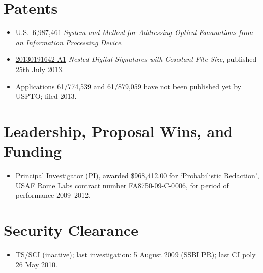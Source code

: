 \documentclass[12pt,twoside,letterpaper]{article}
\begin{document}
\vspace{-8mm}
\section*{Patents}
\vspace{-2mm}
\begin{itemize}
    \item \href{http://www.google.com/patents/US6987461}{U.S.\ 6,987,461} \emph{System and Method
		for Addressing Optical Emanations from an Information Processing Device}.

	\vspace{-2mm}
	\item \href{http://appft.uspto.gov/netacgi/nph-Parser?Sect1=PTO1&Sect2=HITOFF&d=PG01&p=1&u=%2Fnetahtml%2FPTO%2Fsrchnum.html&r=1&f=G&l=50&s1=%2220130191642%22.PGNR.&OS=DN/20130191642&RS=DN/20130191642}{20130191642 A1} \emph{Nested Digital Signatures with Constant File Size}, published 25th July 2013.

	\vspace{-2mm}
	\item Applications 61/774,539 and 61/879,059 have not been published yet by USPTO; filed 2013.
\end{itemize}

\vspace{-8mm}
\section*{Leadership, Proposal Wins, and Funding}
\vspace{-2mm}
\begin{itemize}
	\item Principal Investigator (PI), awarded \$968,412.00 for `Probabilistic Redaction',
	USAF Rome Labs contract number FA8750-09-C-0006, for period of performance 2009--2012.
\end{itemize}

\vspace{-8mm}
\section*{Security Clearance}
\vspace{-2mm}
\begin{itemize}
	\item TS/SCI (inactive); last investigation: 5 August 2009 (SSBI PR); last CI poly
		26 May 2010.
\end{itemize}

\vspace{-8mm}
\end{document}
